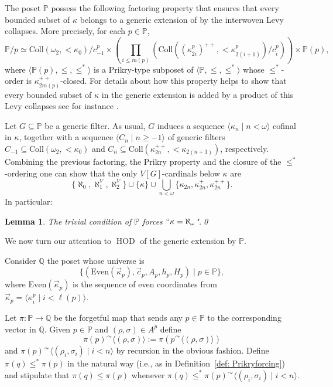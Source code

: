 \documentclass[11pt]{amsart}
\newtheorem{lemma}[theorem]{Lemma}
\theoremstyle{definition}
\theoremstyle{remark}
\newcommand\cat[1]{{}^\curvearrowright #1}
\DeclareMathOperator{\HOD}{HOD}
\def\s{\subseteq}
\begin{document}
 The poset  $\mathbb{P}$ possess the following factoring property that ensures that every bounded subset of $\kappa$ belongs to a generic extension of by the interwoven Levy collapses. More precisely, for each  $p\in \mathbb{P}$, 
$$ \mathbb{P}/p\simeq \mathrm{Coll}(\omega_2,{<}\kappa_0)/c^p_{-1}\times \left(\prod_{i\leq m(p)}(\mathrm{Coll}((\kappa^p_{2i})^{++},{<}\kappa^p_{2(i+1)})/c^p_i)\right)\times \mathbb{P}(p),$$
where $\langle \mathbb{P}(p),\leq, \leq^*\rangle$ is a Prikry-type subposet of $\langle \mathbb{P},\leq, \leq^*\rangle$ whose  $\leq^*$-order is $\kappa_{2  m(p)}^{++}$-closed. For details about how this  property helps to show that every bounded subset of $\kappa$ in the generic extension is added by a product of this Levy collapses see for instance \cite[Lemma~3.15]{PartIII}.

\smallskip


Let $G\s \mathbb{P}$ be a  generic filter. As usual, $G$ induces a  sequence $\langle \kappa_n\mid n<\omega\rangle$ cofinal in $\kappa$, together with a  sequence $\langle C_n\mid n\geq -1\rangle $ of generic filters $C_{-1}\s \mathrm{Coll}(\omega_2,{<}\kappa_0)$ and $C_n\s \mathrm{Coll}(\kappa_{2n}^{++}, {<}\kappa_{2(n+1)})$, respectively. Combining the previous factoring, the Prikry property  and the closure of the $\leq^*$-ordering one can show that the only $V[G]$-cardinals below $\kappa$ are $$\textstyle \{\aleph_0,\aleph_1^V, \aleph_2^V\}\cup \{\kappa\}\cup \bigcup_{n<\omega}\{\kappa_{2n},\kappa_{2n}^+,\kappa^{++}_{2n}\}.$$
In particular:
\begin{lemma}
   The trivial condition of $\mathbb{P}$ forces $``\kappa=\aleph_\omega$".\qed 
\end{lemma}

We now turn our attention to $\HOD$ of the generic extension by $\mathbb{P}$.

\smallskip

Consider $\mathbb{Q}$ the poset whose universe is
$$\{(\mathrm{Even}(\vec{\kappa}_p),\vec{c}_p, A_p, h_p, H_p)\mid p\in \mathbb{P}\},$$
where $\mathrm{Even}(\vec\kappa_p)$ is the sequence of even coordinates from $\vec{\kappa}_p = \langle \kappa_i^p\mid i<\ell(p)\rangle$.

Let $\pi\colon \mathbb{P}\to \mathbb{Q}$ be the forgetful map that sends any $p\in \mathbb{P}$ to the corresponding vector in $\mathbb{Q}$. Given $p\in \mathbb{P}$ and $(\rho,\sigma)\in A^p$  define 
$$\pi(p)\cat \langle (\rho,\sigma)\rangle:=\pi(p\cat \langle (\rho,\sigma)\rangle)$$
and $\pi(p)\cat \langle (\rho_i,\sigma_i)\mid i<n\rangle$ by recursion in the obvious fashion.  Define $\pi(q)\leq^* \pi(p)$ in the natural way (i.e., as in Definition~\ref{def: Prikryforcing})  and stipulate that  $\pi(q)\leq \pi(p)$ whenever $\pi(q)\leq^*\pi(p)\cat \langle (\rho_i,\sigma_i)\mid i<n\rangle$.
\end{document}
